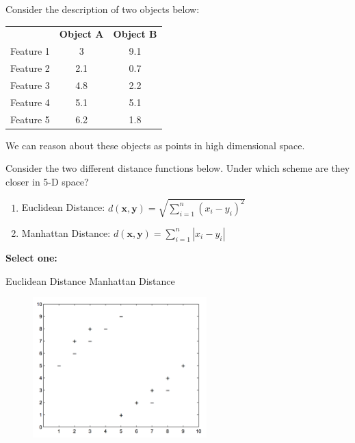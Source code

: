 \documentclass[11pt,addpoints,answers]{exam}
\numberwithin{equation}{section} %
\numberwithin{figure}{section} %
\numberwithin{table}{section} %
\newcommand{\xv}{\mathbf{x}}
\newcommand{\yv}{\mathbf{y}}
\begin{document}
\begin{questions}
    \question[3] Consider the description of two objects below:
    
    \begin{table}[H]
        \centering
        \begin{tabular}{c c c}
             & \textbf{Object A} & \textbf{Object B} \\
            Feature 1 & 3 & 9.1 \\
            Feature 2 & 2.1 & 0.7 \\
            Feature 3 & 4.8 & 2.2 \\
            Feature 4 & 5.1 & 5.1 \\
            Feature 5 & 6.2 & 1.8 
        \end{tabular}
    \end{table}
    We can reason about these objects as points in high dimensional space.
    
    Consider the two different distance functions below. Under which scheme are they closer in 5-D space?
    \begin{enumerate}
        \item Euclidean Distance: $d(\xv, \yv) = \sqrt{\sum_{i=1}^n (x_i - y_i)^2}$
        \item Manhattan Distance: $d(\xv, \yv) = \sum_{i=1}^n |x_i - y_i|$
    \end{enumerate}
    
    \textbf{Select one:}
    \begin{checkboxes}
        \choice Euclidean Distance
        \choice Manhattan Distance
    \end{checkboxes}

    
    
    \begin{figure}[H]
        \centering
        \includegraphics[width = 0.6\textwidth]{Q2_knn.png}
        \label{Q2_knn}
    \end{figure}


\end{questions}
\end{document}
